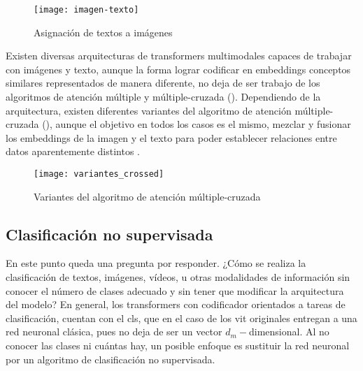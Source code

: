 			\begin{figure}[!h]
				\centering
				\texttt{[image: imagen-texto]}
				\caption{Asignación de textos a imágenes \cite{clip}}
				\label{fig:textos_imagenes}
			\end{figure}
			
			Existen diversas arquitecturas de transformers multimodales capaces de trabajar con imágenes y texto, aunque la forma lograr codificar en embeddings conceptos similares representados de manera diferente, no deja de ser trabajo de los algoritmos de atención múltiple y múltiple-cruzada (). Dependiendo de la arquitectura, existen diferentes variantes del algoritmo de atención múltiple-cruzada (), aunque el objetivo en todos los casos es el mismo, mezclar y fusionar los embeddings de la imagen y el texto para poder establecer relaciones entre datos aparentemente distintos \cite{multimodal_transformers}. 
			
			\begin{figure}[!h]
				\centering
				\texttt{[image: variantes\_crossed]}
				\caption{Variantes del algoritmo de atención múltiple-cruzada \cite{multimodal_transformers}}
				\label{fig:variantes_crossed}
			\end{figure}
			
			\subsection{Clasificación no supervisada}
			
				En este punto queda una pregunta por responder. ¿Cómo se realiza la clasificación de textos, imágenes, vídeos, u otras modalidades de información sin conocer el número de clases adecuado y sin tener que modificar la arquitectura del modelo? En general, los transformers con codificador orientados a tareas de clasificación, cuentan con el \gls{cls}, que en el caso de los \gls{vit} originales entregan a una red neuronal clásica, pues no deja de ser un vector $d_m-$dimensional. Al no conocer las clases ni cuántas hay, un posible enfoque es sustituir la red neuronal por un algoritmo de clasificación no supervisada. \\
				
